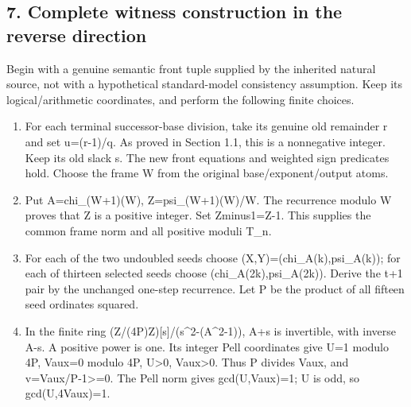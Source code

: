 \subsection*{7. Complete witness construction in the reverse direction}



Begin with a genuine semantic front tuple supplied by the inherited natural source, not with a hypothetical standard-model consistency assumption. Keep its logical/\allowbreak{}arithmetic coordinates, and perform the following finite choices.



\begin{enumerate}

\item For each terminal successor-base division, take its genuine old remainder r and set u=\allowbreak{}(r-1)/\allowbreak{}q. As proved in Section 1.1, this is a nonnegative integer. Keep its old slack s. The new front equations and weighted sign predicates hold. Choose the frame W from the original base/\allowbreak{}exponent/\allowbreak{}output atoms.

\item Put A=\allowbreak{}chi\_\allowbreak{}(W+\allowbreak{}1)(W), Z=\allowbreak{}psi\_\allowbreak{}(W+\allowbreak{}1)(W)/\allowbreak{}W. The recurrence modulo W proves that Z is a positive integer. Set Zminus1=\allowbreak{}Z-1. This supplies the common frame norm and all positive moduli T\_\allowbreak{}n.

\item For each of the two undoubled seeds choose (X,Y)=\allowbreak{}(chi\_\allowbreak{}A(k),psi\_\allowbreak{}A(k)); for each of thirteen selected seeds choose (chi\_\allowbreak{}A(2k),psi\_\allowbreak{}A(2k)). Derive the t+\allowbreak{}1 pair by the unchanged one-step recurrence. Let P be the product of all fifteen seed ordinates squared.

\item In the finite ring (Z/\allowbreak{}(4P)Z)[s]/\allowbreak{}(s\textasciicircum{}\allowbreak{}2-(A\textasciicircum{}\allowbreak{}2-1)), A+\allowbreak{}s is invertible, with inverse A-s. A positive power is one. Its integer Pell coordinates give U=\allowbreak{}1 modulo 4P, Vaux=\allowbreak{}0 modulo 4P, U\textgreater{}\allowbreak{}0, Vaux\textgreater{}\allowbreak{}0. Thus P divides Vaux, and v=\allowbreak{}Vaux/\allowbreak{}P-1\textgreater{}\allowbreak{}=\allowbreak{}0. The Pell norm gives gcd(U,Vaux)=\allowbreak{}1; U is odd, so gcd(U,4Vaux)=\allowbreak{}1.


\end{enumerate}
